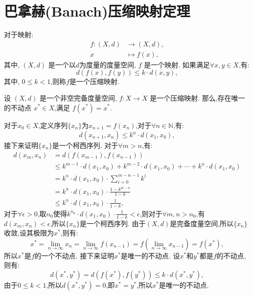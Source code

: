 \section{巴拿赫(Banach)压缩映射定理}
\begin{defn}[压缩映射]\label{def:comp_map}\cite{enwiki:1216903952}
    对于映射:
\begin{align*}
    f :(X,d) & \to (X,d), \\
    x & \mapsto f(x),
\end{align*}
其中, $(X,d)$ 是一个以$d$为度量的度量空间, $f$ 是一个映射. 如果满足$\forall x, y \in X$,有:
\begin{equation}
    d(f(x), f(y)) \leq k \cdot d(x, y),
\end{equation}
其中, $0 \leq k < 1$,则称$f$是一个压缩映射. 
\end{defn}

\begin{thm}[巴拿赫压缩映射定理]\label{thm:banach}\cite{enwiki:1216903952}
    设 $(X, d)$ 是一个非空完备度量空间, $f : X \to X$ 是一个压缩映射. 那么,存在唯一的不动点 $x^* \in X$,满足 $f(x^*) = x^*$. 
\end{thm}
\begin{pf}
    对于$x_0 \in X$,定义序列$\{x_n\}$为$x_{n+1}=f(x_n)$,对于$\forall n \in \mathbb{N}$,有:
    \begin{equation}
        d(x_{n+1}, x_n)  \leq k^n \cdot d(x_1, x_0),
    \end{equation}
    接下来证明$\{x_n\}$是一个柯西序列. 对于$\forall m > n$,有:
    \begin{align*}
        d(x_m,x_n) & = d(f(x_{m-1}), f(x_{n-1})) \\
        & \leq k^{m-1} \cdot d(x_1, x_0) + k^{m-2} \cdot d(x_1, x_0) + \cdots + k^{n} \cdot d(x_1, x_0) \\
        & = k^n \cdot d(x_1, x_0) \cdot \sum_{i=0}^{m-n-1} k^i \\
        & = k^n \cdot d(x_1, x_0) \cdot \frac{1-k^{m-n}}{1-k} \\
        & \leq k^n \cdot d(x_1, x_0) \cdot \frac{1}{1-k},
    \end{align*}
    对于$\forall \epsilon > 0$,取$n_0$使得$k^{n_0} \cdot d(x_1, x_0) \cdot \frac{1}{1-k} < \epsilon$,则对于$\forall m, n > n_0$,有$d(x_m, x_n) < \epsilon$,所以$\{x_n\}$是一个柯西序列. 由于$(X, d)$是完备度量空间,所以$\{x_n\}$收敛,设其极限为$x^*$,则有:
    \begin{equation}
        x^* = \lim_{n \to \infty} x_n = \lim_{n \to \infty} f(x_{n-1}) = f(\lim_{n \to \infty} x_{n-1}) = f(x^*),
    \end{equation}
    所以$x^*$是$f$的一个不动点. 接下来证明$x^*$是唯一的不动点. 设$x^*$和$y^*$都是$f$的不动点,则有:
    \begin{equation}
        d(x^*, y^*) = d(f(x^*), f(y^*)) \leq k \cdot d(x^*, y^*),
    \end{equation}
    由于$0 \leq k < 1$,所以$d(x^*, y^*) = 0$,即$x^* = y^*$,所以$x^*$是唯一的不动点. 
\end{pf}
